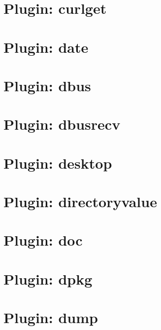 \let\mypdfximage\pdfximage\def\pdfximage{\immediate\mypdfximage}\documentclass[twoside]{book}
\newcommand{\+}{\discretionary{\mbox{\scriptsize$\hookleftarrow$}}{}{}}
\begin{document}
\chapter{Plugin\+: curlget}
\label{md_src_plugins_curlget_README}

\chapter{Plugin\+: date}
\label{md_src_plugins_date_README}

\chapter{Plugin\+: dbus}
\label{md_src_plugins_dbus_README}

\chapter{Plugin\+: dbusrecv}
\label{md_src_plugins_dbusrecv_README}

\chapter{Plugin\+: desktop}
\label{md_src_plugins_desktop_README}

\chapter{Plugin\+: directoryvalue}
\label{md_src_plugins_directoryvalue_README}

\chapter{Plugin\+: doc}
\label{md_src_plugins_doc_README}

\chapter{Plugin\+: dpkg}
\label{md_src_plugins_dpkg_README}

\chapter{Plugin\+: dump}
\label{md_src_plugins_dump_README}

\end{document}
